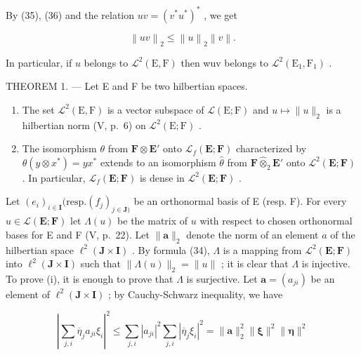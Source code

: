 By (35), (36) and the relation \(uv = (v^{*}u^{*})^{*}\) , we get

\[
\left\| u v \right\| _ {2} \leqslant \left\| u \right\| _ {2} \left\| v \right\|.\tag{37}
\]

In particular, if \(u\) belongs to \(\mathcal{L}^2(\mathrm{E},\mathrm{F})\) then wuv belongs to \(\mathcal{L}^2(\mathrm{E}_1,\mathrm{F}_1)\) .

THEOREM 1. --- Let E and F be two hilbertian spaces.

\begin{enumerate}
\def\labelenumi{(\roman{enumi})}
\item
  The set \(\mathcal{L}^2 (\mathrm{E},\mathrm{F})\) is a vector subspace of \(\mathcal{L}(\mathrm{E};\mathrm{F})\) and \(u\mapsto \| u\| _2\) is a hilbertian norm (V, p.~6) on \(\mathcal{L}^2 (\mathrm{E};\mathrm{F})\) .
\item
  The isomorphism \(\theta\) from \(\mathbf{F} \otimes \mathbf{E}'\) onto \(\mathcal{L}_f(\mathbf{E};\mathbf{F})\) characterized by \(\theta(y \otimes x^*) = yx^*\) extends to an isomorphism \(\hat{\theta}\) from \(\mathbf{F} \hat{\otimes}_2 \mathbf{E}'\) onto \(\mathcal{L}^2(\mathbf{E};\mathbf{F})\) . In particular, \(\mathcal{L}_f(\mathbf{E};\mathbf{F})\) is dense in \(\mathcal{L}^2(\mathbf{E};\mathbf{F})\) .
\end{enumerate}

Let \((e_i)_{i\in \mathbf{I}}(\mathrm{resp.}(f_j)_{j\in \mathbf{J})}\) be an orthonormal basis of E (resp. F). For every \(u\in \mathcal{L}(\mathbf{E};\mathbf{F})\) let \(\Lambda (u)\) be the matrix of \(u\) with respect to chosen orthonormal bases for E and F (V, p.~22). Let \(\| \mathbf{a}\| _2\) denote the norm of an element \(a\) of the hilbertian space \(\ell^2 (\mathbf{J}\times \mathbf{I})\) . By formula (34), \(\Lambda\) is a mapping from \(\mathcal{L}^2 (\mathbf{E};\mathbf{F})\) into \(\ell^2 (\mathbf{J}\times \mathbf{I})\) such that \(\| \Lambda (u)\| _2 = \| u\|\) ; it is clear that \(\Lambda\) is injective. To prove (i), it is enough to prove that \(\Lambda\) is surjective. Let \(\mathbf{a} = (a_{ji})\) be an element of \(\ell^2 (\mathbf{J}\times \mathbf{I})\) ; by Cauchy-Schwarz inequality, we have

\[
\left| \sum_ {j, i} \overline {{{{\eta}}}} _ {j} a _ {j i} \xi_ {i} \right| ^ {2} \leqslant \sum_ {j, i} | a _ {j i} | ^ {2} \sum_ {j, i} | \overline {{{{\eta}}}} _ {j} \xi_ {i} | ^ {2} = \| \mathbf {a} \| _ {2} ^ {2} \| \boldsymbol {\xi} \| ^ {2} \| \boldsymbol {\eta} \| ^ {2}
\]

